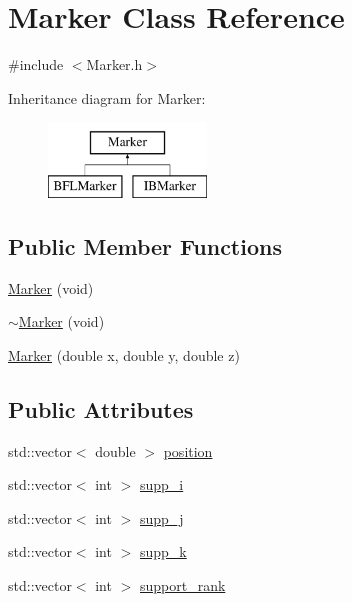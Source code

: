 \hypertarget{class_marker}{}\section{Marker Class Reference}
\label{class_marker}


{\ttfamily \#include $<$Marker.\+h$>$}

Inheritance diagram for Marker\+:\begin{figure}[H]
\begin{center}
\leavevmode
\includegraphics[height=2.000000cm]{class_marker}
\end{center}
\end{figure}
\subsection*{Public Member Functions}
\begin{DoxyCompactItemize}
\item 
\hyperlink{class_marker_ac09c0211aaad490b0dd4ac448c69ba36}{Marker} (void)
\item 
\hyperlink{class_marker_ac34f00758cfb07bcf550209083633eb6}{$\sim$\+Marker} (void)
\item 
\hyperlink{class_marker_a1e5a9aa6f1002b5f2ce6c5220ee01225}{Marker} (double x, double y, double z)
\end{DoxyCompactItemize}
\subsection*{Public Attributes}
\begin{DoxyCompactItemize}
\item 
std\+::vector$<$ double $>$ \hyperlink{class_marker_a988d209a817df43124a100fb54b00b70}{position}
\item 
std\+::vector$<$ int $>$ \hyperlink{class_marker_af2b0bab614609f2e9c5bebc1db3f8174}{supp\+\_\+i}
\item 
std\+::vector$<$ int $>$ \hyperlink{class_marker_a400ae7b896edf2abe0403dde435b0977}{supp\+\_\+j}
\item 
std\+::vector$<$ int $>$ \hyperlink{class_marker_ab06b6d2cfb7221579cf32538f0c79b82}{supp\+\_\+k}
\item 
std\+::vector$<$ int $>$ \hyperlink{class_marker_a183752ab41e56b159570a103c25f2aec}{support\+\_\+rank}
\end{DoxyCompactItemize}


